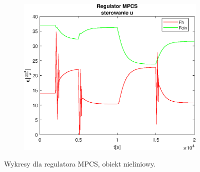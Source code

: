 \begin{figure}[h!]
   \begin{subfigure}[b]{0.4\textwidth}
      \includegraphics[width=1\linewidth]{img/MPCSanaRK/MPCSRKControlN100Nu10l10.eps}
      \caption{}
      \label{fig:fig:MPCSRKN100Nu10l103}
   \end{subfigure}
       
   \caption{Wykresy dla regulatora MPCS, obiekt nieliniowy.}
   \label{fig:MPCSRKN100Nu10l10}
\end{figure}
           
